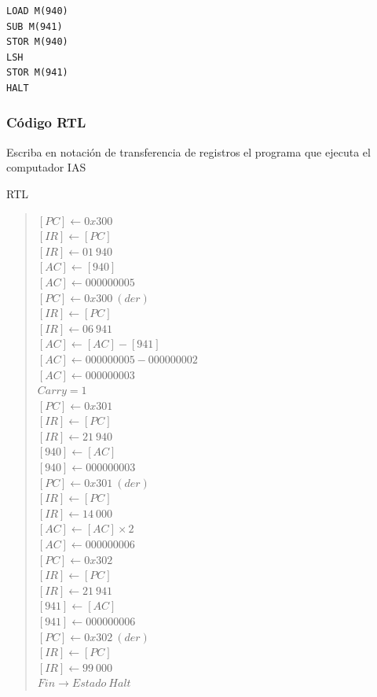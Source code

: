 \documentclass{article}
\begin{document}
\begin{verbatim}
LOAD M(940)
SUB M(941)
STOR M(940)
LSH
STOR M(941)
HALT
\end{verbatim}
\subsubsection{Código RTL}
\label{sec:org428f856}
Escriba en notación de transferencia de registros el programa que
ejecuta el computador IAS

RTL

\begin{verse}
\([PC] \leftarrow 0x300\)\\
\([IR] \leftarrow [PC]\)\\
\([IR] \leftarrow 01\ 940\)\\
\([AC] \leftarrow [940]\)\\
\([AC] \leftarrow 000000005\)\\
\([PC] \leftarrow 0x300\ (der)\)\\
\([IR] \leftarrow [PC]\)\\
\([IR] \leftarrow 06\ 941\)\\
\([AC] \leftarrow [AC] - [941]\)\\
\([AC] \leftarrow 000000005 - 000000002\)\\
\([AC] \leftarrow 000000003\)\\
\(Carry = 1\)\\
\([PC] \leftarrow 0x301\)\\
\([IR] \leftarrow [PC]\)\\
\([IR] \leftarrow 21\ 940\)\\
\([940] \leftarrow [AC]\)\\
\([940] \leftarrow 000000003\)\\
\([PC] \leftarrow 0x301\ (der)\)\\
\([IR] \leftarrow [PC]\)\\
\([IR] \leftarrow 14\ 000\)\\
\([AC] \leftarrow [AC] \times 2\)\\
\([AC] \leftarrow 000000006\)\\
\([PC] \leftarrow 0x302\)\\
\([IR] \leftarrow [PC]\)\\
\([IR] \leftarrow 21\ 941\)\\
\([941] \leftarrow [AC]\)\\
\([941] \leftarrow 000000006\)\\
\([PC] \leftarrow 0x302\ (der)\)\\
\([IR] \leftarrow [PC]\)\\
\([IR] \leftarrow 99\ 000\)\\
\(Fin \to Estado\ Halt\)\\
\end{verse}



\printbibliography
\end{document}
